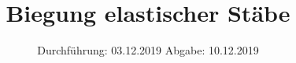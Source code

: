 

\subject{V103}
\title{Biegung elastischer Stäbe}
\date{%
  Durchführung: 03.12.2019
  \hspace{3em}
  Abgabe: 10.12.2019
}



\maketitle
\thispagestyle{empty}
\tableofcontents
\newpage







\printbibliography{}


